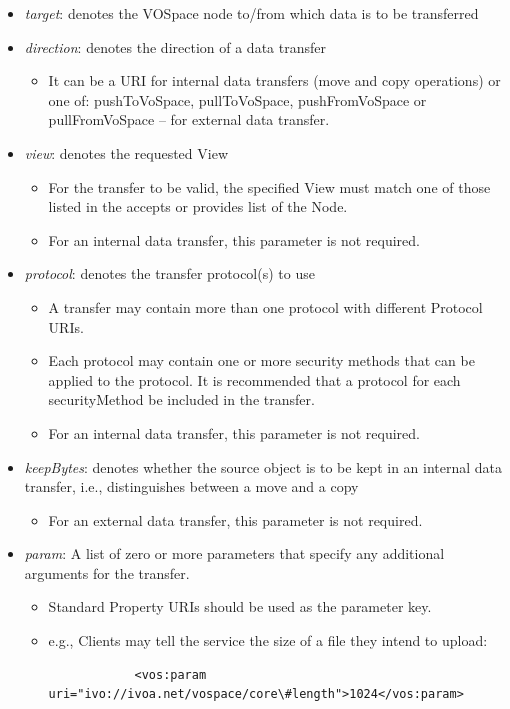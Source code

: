 \documentclass[11pt,a4paper]{ivoa}
\begin{document}
\begin{itemize}
    \item \emph{target}: denotes the VOSpace node to/from which data is to be transferred
    \item \emph{direction}: denotes the direction of a data transfer
        \begin{itemize}
            \item It can be a URI for internal data transfers (move and copy operations) or one of: pushToVoSpace, pullToVoSpace, pushFromVoSpace or pullFromVoSpace -- for external data transfer.
        \end{itemize}
    \item \emph{view}: denotes the requested View
        \begin{itemize}
            \item For the transfer to be valid, the specified View must match one of those listed in the accepts or provides list of the Node.
            \item For an internal data transfer, this parameter is not required.
        \end{itemize}
    \item \emph{protocol}: denotes the transfer protocol(s) to use
        \begin{itemize}
            \item A transfer may contain more than one protocol with different Protocol URIs.
            \item Each protocol may contain one or more security methods that can be applied to the protocol.  It is recommended that a protocol for each securityMethod be included in the transfer.
            \item For an internal data transfer, this parameter is not required.
        \end{itemize}
    \item \emph{keepBytes}: denotes whether the source object is to be kept in an internal data transfer, i.e., distinguishes between a move and a copy
        \begin{itemize}
            \item For an external data transfer, this parameter is not required.
        \end{itemize}
    \item \emph{param}: A list of zero or more parameters that specify any additional arguments for the transfer.
        \begin{itemize}
            \item Standard Property URIs should be used as the parameter key.
            \item e.g., Clients may tell the service the size of a file they intend to upload: 
            \begin{lstlisting}
            <vos:param uri="ivo://ivoa.net/vospace/core\#length">1024</vos:param>
            \end{lstlisting}
        \end{itemize}
\end{itemize}
\end{document}
